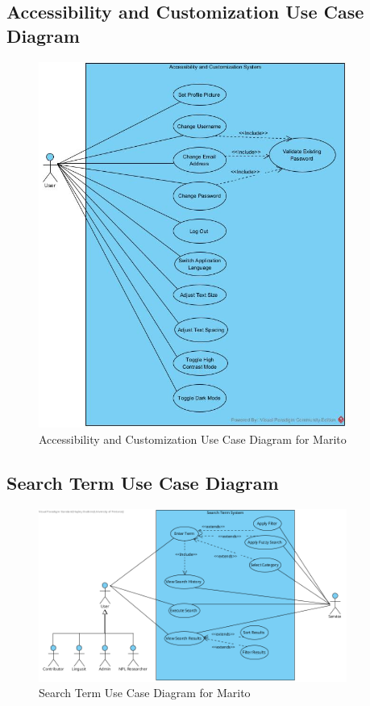 \documentclass[12pt]{article}
\begin{document}
\subsection{Accessibility and Customization Use Case Diagram}
\begin{figure}[H]
  \centering
  \includegraphics[width=0.9\textwidth]{Accessibility and Customization System.jpg}
  \caption{Accessibility and Customization Use Case Diagram for Marito}
  \label{fig:accessibility-customization-use-case}
\end{figure}

\subsection{Search Term Use Case Diagram}
\begin{figure}[H]
  \centering
  \includegraphics[width=0.9\textwidth]{SearchTermUseCase.png}
  \caption{Search Term Use Case Diagram for Marito}
  \label{fig:search-use-case}
\end{figure}
\end{document}
